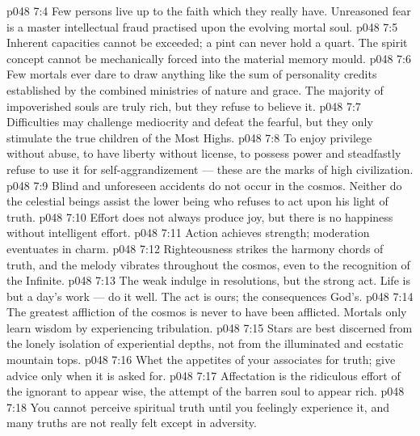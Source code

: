 \vs p048 7:4 \bibnobreakspace Few persons live up to the faith which they really have. Unreasoned fear is a master intellectual fraud practised upon the evolving mortal soul.
\vs p048 7:5 \bibnobreakspace Inherent capacities cannot be exceeded; a pint can never hold a quart. The spirit concept cannot be mechanically forced into the material memory mould.
\vs p048 7:6 \bibnobreakspace Few mortals ever dare to draw anything like the sum of personality credits established by the combined ministries of nature and grace. The majority of impoverished souls are truly rich, but they refuse to believe it.
\vs p048 7:7 \bibnobreakspace Difficulties may challenge mediocrity and defeat the fearful, but they only stimulate the true children of the Most Highs.
\vs p048 7:8 \bibnobreakspace To enjoy privilege without abuse, to have liberty without license, to possess power and steadfastly refuse to use it for self\hyp{}aggrandizement --- these are the marks of high civilization.
\vs p048 7:9 \bibnobreakspace Blind and unforeseen accidents do not occur in the cosmos. Neither do the celestial beings assist the lower being who refuses to act upon his light of truth.
\vs p048 7:10 \bibnobreakspace Effort does not always produce joy, but there is no happiness without intelligent effort.
\vs p048 7:11 \bibnobreakspace Action achieves strength; moderation eventuates in charm.
\vs p048 7:12 \bibnobreakspace Righteousness strikes the harmony chords of truth, and the melody vibrates throughout the cosmos, even to the recognition of the Infinite.
\vs p048 7:13 \bibnobreakspace The weak indulge in resolutions, but the strong act. Life is but a day’s work --- do it well. The act is ours; the consequences God’s.
\vs p048 7:14 \bibnobreakspace The greatest affliction of the cosmos is never to have been afflicted. Mortals only learn wisdom by experiencing tribulation.
\vs p048 7:15 \bibnobreakspace Stars are best discerned from the lonely isolation of experiential depths, not from the illuminated and ecstatic mountain tops.
\vs p048 7:16 \bibnobreakspace Whet the appetites of your associates for truth; give advice only when it is asked for.
\vs p048 7:17 \bibnobreakspace Affectation is the ridiculous effort of the ignorant to appear wise, the attempt of the barren soul to appear rich.
\vs p048 7:18 \bibnobreakspace You cannot perceive spiritual truth until you feelingly experience it, and many truths are not really felt except in adversity.
